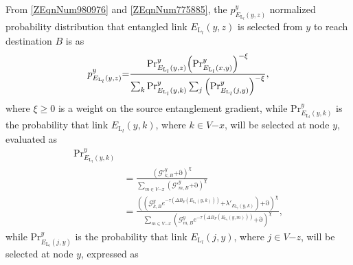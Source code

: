 \documentclass[11pt]{article}%
\begin{document}
From \eqref{ZEqnNum980976} and \eqref{ZEqnNum775885}, the $p^y_{E_{{\mathrm{L}}_l}\left(y,z\right)}$ normalized probability distribution that entangled link $E_{{\mathrm{L}}_l}\left(y,z\right)$ is selected from $y$ to reach destination $B$ is as
\begin{equation} \label{ZEqnNum338413} 
p^y_{E_{{\mathrm{L}}_l}\left(y,z\right)}\\\mathrm{=}\frac{\mathrm{P}{\mathrm{r}}^y_{E_{{\mathrm{L}}_l}\left(y,z\right)}{\left(\mathrm{P}{\mathrm{r}}^y_{E_{{\mathrm{L}}_l}\left(x,y\right)}\right)}^{\mathrm{-}\xi }}{\sum_k{\mathrm{P}{\mathrm{r}}^y_{E_{{\mathrm{L}}_l}\left(y,k\right)}\sum_j{{\left(\mathrm{P}{\mathrm{r}}^y_{E_{{\mathrm{L}}_l}\left(j,y\right)}\right)}^{\mathrm{-}\xi }}}},                                    
\end{equation} 
where $\xi \mathrm{\ge }\mathrm{0}$ is a weight on the source entanglement gradient, while $\mathrm{P}{\mathrm{r}}^y_{E_{{\mathrm{L}}_l}\left(y,k\right)}$ is the probability that link $E_{{\mathrm{L}}_l}\left(y,k\right)$, where $k\mathrm{\in }V\mathrm{-}x$, will be selected at node $y$, evaluated as
\begin{equation} \label{4)} 
\begin{split}
\mathrm{P}{\mathrm{r}}^y_{E_{{\mathrm{L}}_l}\left(y,k\right)}\\&\mathrm{=}\frac{{\left({\mathcal{G}}'^y_{k,B}\mathrm{+}\mathrm{\partial }\right)}^{\chi }}{\sum_{m\mathrm{\in }V\mathrm{-}x}{{\left({\mathcal{G}}'^y_{m,B}\mathrm{+}\mathrm{\partial }\right)}^{\chi }}}\\&\mathrm{=}\frac{{\left(\left({\mathcal{G}}^y_{k,B}e^{\mathrm{-}\tau \left(\mathit{\Delta}B_F\left(E_{{\mathrm{L}}_l}\left(y,k\right)\right)\right)}\mathrm{+}{\lambda }'_{E_{{\mathrm{L}}_l}\left(y,k\right)}\right)\mathrm{+}\mathrm{\partial }\right)}^{\chi }}{\sum_{m\mathrm{\in }V\mathrm{-}x}{{\left({\mathcal{G}}^y_{m,B}e^{\mathrm{-}\tau \left(\mathit{\Delta}B_F\left(E_{{\mathrm{L}}_l}\left(y,m\right)\right)\right)}\mathrm{+}\mathrm{\partial }\right)}^{\chi }}},                
\end{split}
\end{equation} 
while $\mathrm{P}{\mathrm{r}}^y_{E_{{\mathrm{L}}_l}\left(j,y\right)}$ is the probability that link $E_{{\mathrm{L}}_l}\left(j,y\right)$, where $j\mathrm{\in }V\mathrm{-}z$, will be selected at node $y$, expressed as
\end{document}
